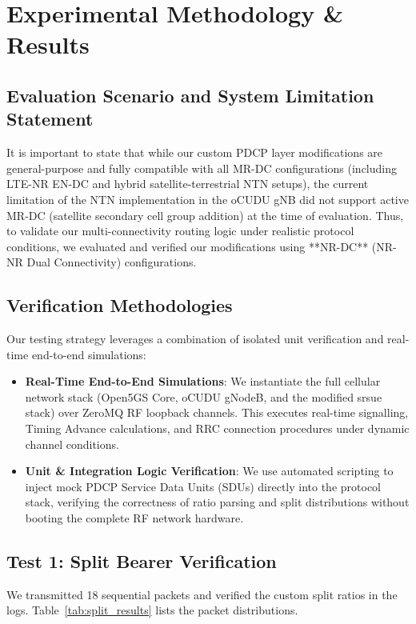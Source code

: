 \documentclass[conference]{IEEEtran}
\begin{document}
\section{Experimental Methodology \& Results}

\subsection{Evaluation Scenario and System Limitation Statement}
It is important to state that while our custom PDCP layer modifications are general-purpose and fully compatible with all MR-DC configurations (including LTE-NR EN-DC and hybrid satellite-terrestrial NTN setups), the current limitation of the NTN implementation in the oCUDU gNB did not support active MR-DC (satellite secondary cell group addition) at the time of evaluation. Thus, to validate our multi-connectivity routing logic under realistic protocol conditions, we evaluated and verified our modifications using **NR-DC** (NR-NR Dual Connectivity) configurations.

\subsection{Verification Methodologies}
Our testing strategy leverages a combination of isolated unit verification and real-time end-to-end simulations:
\begin{itemize}
    \item \textbf{Real-Time End-to-End Simulations}: We instantiate the full cellular network stack (Open5GS Core, oCUDU gNodeB, and the modified srsue stack) over ZeroMQ RF loopback channels. This executes real-time signalling, Timing Advance calculations, and RRC connection procedures under dynamic channel conditions.
    \item \textbf{Unit \& Integration Logic Verification}: We use automated scripting to inject mock PDCP Service Data Units (SDUs) directly into the protocol stack, verifying the correctness of ratio parsing and split distributions without booting the complete RF network hardware.
\end{itemize}

\subsection{Test 1: Split Bearer Verification}
We transmitted 18 sequential packets and verified the custom split ratios in the logs. Table~\ref{tab:split_results} lists the packet distributions.
\end{document}
